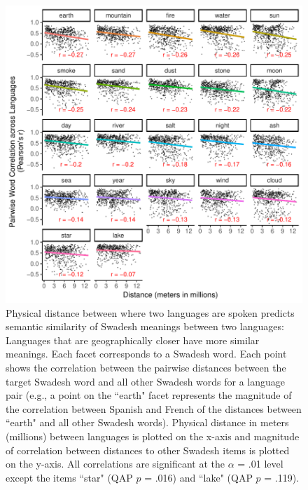 \documentclass[9pt,twoside,lineno]{pnas-new}
\begin{document}
\begin{figure}[h]
\centering
     \includegraphics[width=6in]{suppfigs/swadesh_plot_ED.pdf}
 \caption{Physical distance between where  two languages are spoken predicts semantic similarity of Swadesh \cite{swadesh1952lexico} meanings between two languages: Languages that are geographically closer have more similar meanings. Each facet corresponds to a Swadesh word. Each point shows the correlation between the pairwise distances between the target Swadesh word and all other Swadesh words for a language pair (e.g., a point on the ``earth" facet represents the magnitude of the correlation between Spanish and French of  the distances between ``earth" and all other Swadesh words). Physical distance  in meters (millions) between languages is plotted on the x-axis and magnitude of correlation between distances to other Swadesh items is plotted on the y-axis. All correlations are significant at the $\alpha$ = .01 level except the items ``star" (QAP $p$ = .016) and ``lake" (QAP $p$ = .119).}
 \end{figure}


\pagebreak
\clearpage




\end{document}
